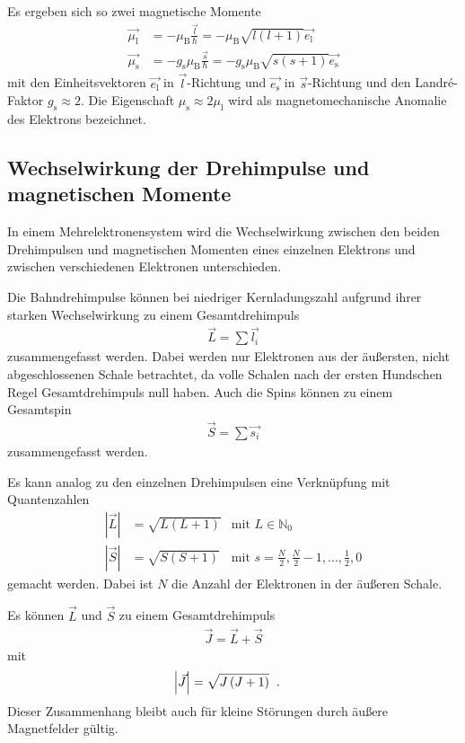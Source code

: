 \documentclass[captions=tableheading]{scrartcl}
\newcommand{\indx}[1]{\text{#1}}
\begin{document}
Es ergeben sich so zwei magnetische Momente
\begin{align}
\vec{\mu_\indx{l}}&=-\mu_\indx{B}\frac{\vec{l}}{\hbar}=-\mu_\indx{B}\sqrt{l\left(l+1\right)}\vec{e_\indx{l}}\\
\vec{\mu_\indx{s}}&=-g_\indx{s}\mu_\indx{B}\frac{\vec{s}}{\hbar}=-g_\indx{s}\mu_\indx{B}\sqrt{s\left(s+1\right)}\vec{e_\indx{s}}
\end{align}
mit den Einheitsvektoren $\vec{e_\indx{l}}$ in $\vec{l}$-Richtung und $\vec{e_\indx{s}}$ in $\vec{s}$-Richtung und den Landr\'{e}-Faktor $g_\indx{s}\approx 2$.
Die Eigenschaft $\mu_\indx{s}\approx 2\mu_\indx{l}$ wird als magnetomechanische Anomalie des Elektrons bezeichnet.
\subsection{Wechselwirkung der Drehimpulse und magnetischen Momente}
In einem Mehrelektronensystem wird die Wechselwirkung zwischen den beiden Drehimpulsen und magnetischen Momenten eines einzelnen Elektrons und zwischen verschiedenen Elektronen unterschieden.

Die Bahndrehimpulse können bei niedriger Kernladungszahl aufgrund ihrer starken Wechselwirkung zu einem Gesamtdrehimpuls
\begin{align}
\vec{L}=\sum \vec{l_i}
\end{align}
zusammengefasst werden.
Dabei werden nur Elektronen aus der äußersten, nicht abgeschlossenen Schale betrachtet, da volle Schalen nach der ersten Hundschen Regel Gesamtdrehimpuls null haben.
Auch die Spins können zu einem Gesamtspin
\begin{align}
\vec{S}=\sum \vec{s_i}
\end{align}
zusammengefasst werden.

Es kann analog zu den einzelnen Drehimpulsen eine Verknüpfung mit Quantenzahlen
\begin{align}
\left| \vec{L} \right| &= \sqrt{L\left(L+1\right)} &  \text{mit } L\in \mathbb{N}_{0}\\
\left| \vec{S} \right| &= \sqrt{S\left(S+1\right)} &  \text{mit }  s=\frac{N}{2},\frac{N}{2}-1,...,\frac{1}{2}, 0
\end{align}
gemacht werden. 
Dabei ist $N$ die Anzahl der Elektronen in der äußeren Schale.

Es können $\vec{L}$ und $\vec{S}$ zu einem Gesamtdrehimpuls
\begin{align}
\vec{J}=\vec{L}+\vec{S}
\end{align}
mit
\begin{align}
\left| \vec{J} \right| &= \sqrt{J\left(J+1\right)} \hspace{0.2cm}\text{.}
\end{align}
Dieser Zusammenhang bleibt auch für kleine Störungen durch äußere Magnetfelder gültig.
\end{document}
